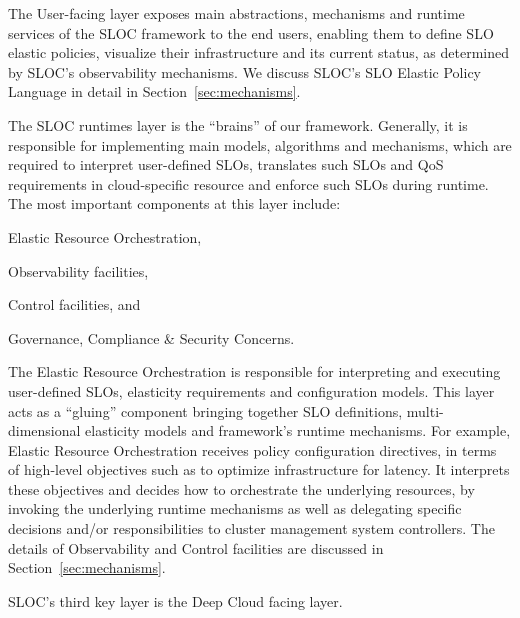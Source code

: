 The User-facing layer exposes main abstractions, mechanisms
and runtime services of the SLOC framework to the end users,
enabling them to define SLO elastic policies, visualize their
infrastructure and its current status, as determined by SLOC's
observability mechanisms. We discuss SLOC's SLO Elastic 
Policy Language in detail in Section~\ref{sec:mechanisms}.

The SLOC runtimes layer is the ``brains'' of our framework.
Generally, it is responsible for implementing main models, algorithms and
mechanisms, which are required to interpret user-defined SLOs,
translates such SLOs and QoS requirements in cloud-specific
resource  and enforce such SLOs during runtime.
The most important components at this layer include:
\begin{inparaenum}[i)]
  \item Elastic Resource Orchestration,
  \item Observability facilities, 
  \item Control facilities, and
	\item Governance, Compliance \& Security Concerns.
\end{inparaenum}
%
The Elastic Resource Orchestration is responsible for interpreting and 
executing user-defined SLOs, elasticity requirements and 
configuration models.  
This layer acts as a ``gluing'' component bringing together SLO 
definitions, multi-dimensional elasticity models and framework's 
runtime mechanisms. For example, Elastic Resource 
Orchestration receives policy configuration directives, 
in terms of high-level objectives such as to optimize 
infrastructure for latency. It interprets these objectives 
and decides how to orchestrate the underlying resources, 
by invoking the underlying  runtime mechanisms as well as 
delegating specific decisions and/or responsibilities
to cluster management system controllers. 
The details of Observability and Control facilities are
discussed in Section~\ref{sec:mechanisms}.

SLOC's third key layer is the Deep Cloud facing layer.

